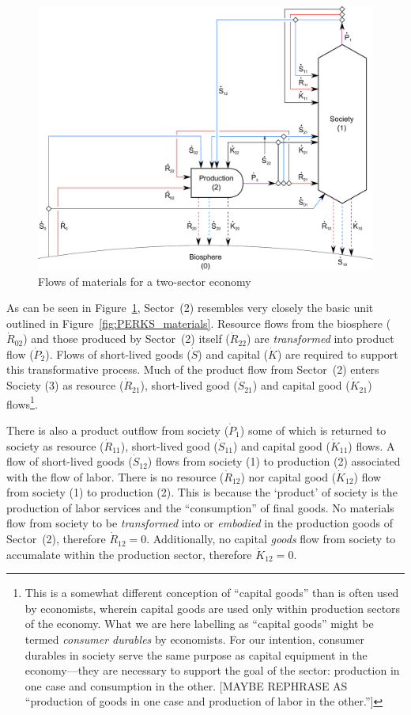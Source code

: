 \begin{figure}[!ht]
\centering
\includegraphics[width=0.8\linewidth]{Part_1/Chapter_Materials/images/2_sector_materials.pdf}
\caption[Flows of materials for a two-sector economy]{Flows of materials for a two-sector economy}
\label{fig:B_materials}
\end{figure}

As can be seen in Figure~\ref{fig:B_materials}, Sector~(2) resembles very closely the basic unit
outlined in Figure~\ref{fig:PERKS_materials}. Resource flows from the biosphere ($\dot{R}_{02}$)
and those produced by Sector~(2) itself ($\dot{R}_{22}$) are \emph{transformed} into product flow
($\dot{P}_{2}$). Flows of short-lived goods ($\dot{S}$) and capital ($\dot{K}$) are required to
support this transformative process. Much of the product flow from Sector~(2) enters Society (3)
as resource ($\dot{R}_{21}$), short-lived good ($\dot{S}_{21}$) and capital good ($\dot{K}_{21}$)
flows\footnote{This is a somewhat different conception of ``capital goods'' than is often used by
economists, wherein capital goods are used only within production sectors of the economy. What we
are here labelling as ``capital goods'' might be termed \emph{consumer durables} by economists. For
our intention, consumer durables in society serve the same purpose as capital equipment in the
economy---they are necessary to support the goal of the sector: production in one case
and consumption in the other. [MAYBE REPHRASE AS ``production of goods in one case and production
of labor in the other.'']}. 

There is also a product outflow from society ($\dot{P}_{1}$) some of which is returned to society
as resource ($\dot{R}_{11}$), short-lived good ($\dot{S}_{11}$) and capital good ($\dot{K}_{11}$)
flows. A flow of short-lived goods ($\dot{S}_{12}$) flows from society (1) to production (2) 
associated with the flow of labor. There is no resource ($\dot{R}_{12}$) nor capital good 
($\dot{K}_{12}$) flow from society (1) to production (2). This is because the `product' of society
is the production of labor services and the ``consumption'' of final goods. No materials flow from
society to be \emph{transformed} into or \emph{embodied} in the production goods of Sector~(2), 
therefore $\dot{R}_{12} = 0$. Additionally, no capital \emph{goods} flow from society to accumalate
within the production sector, therefore $\dot{K}_{12} = 0$.

